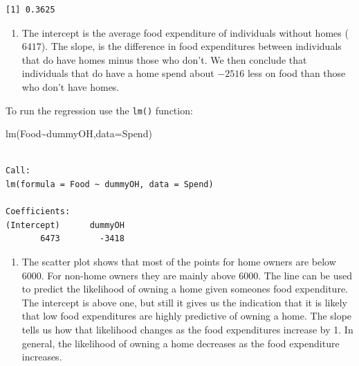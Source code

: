 \documentclass[
  letterpaper,
  DIV=11,
  numbers=noendperiod]{scrreprt}
\newenvironment{Shaded}{\begin{snugshade}}{\end{snugshade}}
\newcommand{\AttributeTok}[1]{\textcolor[rgb]{0.40,0.45,0.13}{#1}}
\newcommand{\FunctionTok}[1]{\textcolor[rgb]{0.28,0.35,0.67}{#1}}
\newcommand{\NormalTok}[1]{\textcolor[rgb]{0.00,0.23,0.31}{#1}}
\newcommand{\SpecialCharTok}[1]{\textcolor[rgb]{0.37,0.37,0.37}{#1}}
\providecommand{\tightlist}{%
  \setlength{\itemsep}{0pt}\setlength{\parskip}{0pt}}\usepackage{longtable,booktabs,array}
\begin{document}
\begin{verbatim}
[1] 0.3625
\end{verbatim}

\begin{blackbox}

\begin{enumerate}
\def\labelenumi{\arabic{enumi}.}
\setcounter{enumi}{1}
\tightlist
\item
  The intercept is the average food expenditure of individuals without
  homes (\(6417\)). The slope, is the difference in food expenditures
  between individuals that do have homes minus those who don't. We then
  conclude that individuals that do have a home spend about \(-2516\)
  less on food than those who don't have homes.
\end{enumerate}

\end{blackbox}

To run the regression use the \texttt{lm()} function:

\begin{Shaded}
\begin{Highlighting}[numbers=left,,]
\FunctionTok{lm}\NormalTok{(Food}\SpecialCharTok{\textasciitilde{}}\NormalTok{dummyOH,}\AttributeTok{data=}\NormalTok{Spend)}
\end{Highlighting}
\end{Shaded}

\begin{verbatim}

Call:
lm(formula = Food ~ dummyOH, data = Spend)

Coefficients:
(Intercept)      dummyOH  
       6473        -3418  
\end{verbatim}

\begin{blackbox}

\begin{enumerate}
\def\labelenumi{\arabic{enumi}.}
\setcounter{enumi}{2}
\tightlist
\item
  The scatter plot shows that most of the points for home owners are
  below \(6000\). For non-home owners they are mainly above \(6000\).
  The line can be used to predict the likelihood of owning a home given
  someones food expenditure. The intercept is above one, but still it
  gives us the indication that it is likely that low food expenditures
  are highly predictive of owning a home. The slope tells us how that
  likelihood changes as the food expenditures increase by 1. In general,
  the likelihood of owning a home decreases as the food expenditure
  increases.
\end{enumerate}

\end{blackbox}
\end{document}
